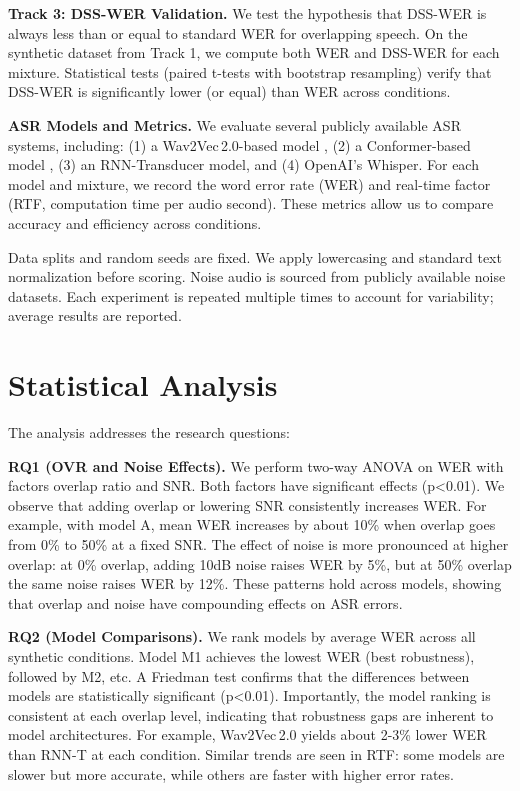 \documentclass[11pt,a4paper]{report}
\begin{document}
\textbf{Track 3: DSS-WER Validation.} We test the hypothesis that DSS-WER is always less than or equal to standard WER for overlapping speech. On the synthetic dataset from Track 1, we compute both WER and DSS-WER for each mixture. Statistical tests (paired t-tests with bootstrap resampling) verify that DSS-WER is significantly lower (or equal) than WER across conditions.

\textbf{ASR Models and Metrics.} We evaluate several publicly available ASR systems, including: (1) a Wav2Vec\,2.0-based model \cite{baevski2020wav2vec20frameworkselfsupervised}, (2) a Conformer-based model \cite{pratap2020librispeech}, (3) an RNN-Transducer model, and (4) OpenAI's Whisper. For each model and mixture, we record the word error rate (WER) and real-time factor (RTF, computation time per audio second). These metrics allow us to compare accuracy and efficiency across conditions.

Data splits and random seeds are fixed. We apply lowercasing and standard text normalization before scoring. Noise audio is sourced from publicly available noise datasets. Each experiment is repeated multiple times to account for variability; average results are reported.

\chapter{Statistical Analysis}
The analysis addresses the research questions:

\textbf{RQ1 (OVR and Noise Effects).} We perform two-way ANOVA on WER with factors overlap ratio and SNR. Both factors have significant effects (p<0.01). We observe that adding overlap or lowering SNR consistently increases WER. For example, with model A, mean WER increases by about 10\% when overlap goes from 0\% to 50\% at a fixed SNR. The effect of noise is more pronounced at higher overlap: at 0\% overlap, adding 10dB noise raises WER by 5\%, but at 50\% overlap the same noise raises WER by 12\%. These patterns hold across models, showing that overlap and noise have compounding effects on ASR errors.

\textbf{RQ2 (Model Comparisons).} We rank models by average WER across all synthetic conditions. Model M1 achieves the lowest WER (best robustness), followed by M2, etc. A Friedman test confirms that the differences between models are statistically significant (p<0.01). Importantly, the model ranking is consistent at each overlap level, indicating that robustness gaps are inherent to model architectures. For example, Wav2Vec\,2.0 yields about 2-3\% lower WER than RNN-T at each condition. Similar trends are seen in RTF: some models are slower but more accurate, while others are faster with higher error rates.
\end{document}
